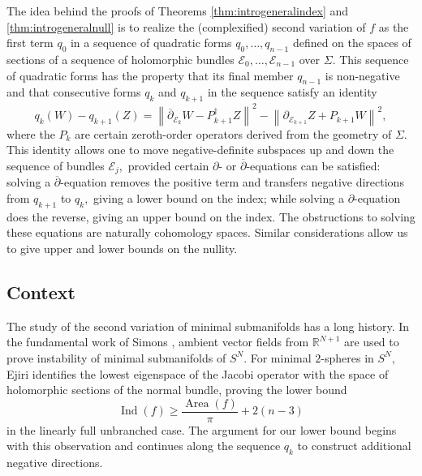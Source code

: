 \documentclass[11pt]{article}
\theoremstyle{definition}
\newcommand{\R}{\mathbb{R}}
\newcommand{\del}{\partial}
\newcommand{\delbar}{\overline{\partial}}
\numberwithin{equation}{section}
\begin{document}
The idea behind the proofs of Theorems \ref{thm:introgeneralindex} and \ref{thm:introgeneralnull} is to realize the (complexified) second variation of $f$ as the first term $q_0$ in a sequence of quadratic forms $q_0, \ldots, q_{n-1}$ defined on the spaces of sections of a sequence of holomorphic bundles $\mathcal{E}_0, \ldots, \mathcal{E}_{n-1}$ over $\Sigma.$ This sequence of quadratic forms has the property that its final member $q_{n-1}$ is non-negative and that consecutive forms $q_k$ and $q_{k+1}$ in the sequence satisfy an identity
\begin{equation*}
    q_k(W)-q_{k+1}(Z) =	\left\lVert	\overline{\partial}_{\mathcal E_k}W-P^\dagger_{k+1}Z \right\rVert^2 - \left\lVert \partial_{\mathcal E_{k+1}}Z+P_{k+1}W \right\rVert^2,
\end{equation*}
where the $P_{k}$ are certain zeroth-order operators derived from the geometry of $\Sigma.$ This identity allows one to move negative-definite subspaces up and down the sequence of bundles $\mathcal{E}_j,$ provided certain $\del$- or $\delbar$-equations can be satisfied: solving a $\delbar$-equation removes the positive term and transfers negative directions from $q_{k+1}$ to $q_k,$ giving a lower bound on the index; while solving a $\del$-equation does the reverse, giving an upper bound on the index. The obstructions to solving these equations are naturally cohomology spaces. Similar considerations allow us to give upper and lower bounds on the nullity.

\subsection{Context}

\indent \indent The study of the second variation of minimal submanifolds has a long history. In the fundamental work of Simons \cite{Simons68}, ambient vector fields from $\R^{N+1}$ are used to prove instability of minimal submanifolds of $S^N.$ For minimal $2$-spheres in $S^N,$ Ejiri \cite{Ejiri83} identifies the lowest eigenspace of the Jacobi operator with the space of holomorphic sections of the normal bundle, proving the lower bound
\begin{equation*}
    \operatorname{Ind} (f) \geq \frac{\operatorname{Area}(f)}{\pi} + 2(n-3) 
\end{equation*}
in the linearly full unbranched case. The argument for our lower bound begins with this observation and continues along the sequence $q_k$ to construct additional negative directions.
\end{document}
